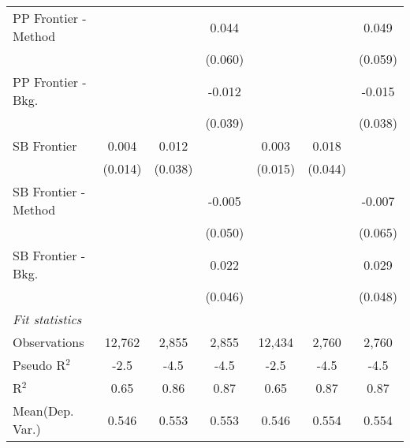 \begin{tabular}{lcccccc}
   PP Frontier - Method &                &         & 0.044   &                &         & 0.049\\   
                        &                &         & (0.060) &                &         & (0.059)\\   
   PP Frontier - Bkg.   &                &         & -0.012  &                &         & -0.015\\   
                        &                &         & (0.039) &                &         & (0.038)\\   
   SB Frontier          & 0.004          & 0.012   &         & 0.003          & 0.018   &   \\   
                        & (0.014)        & (0.038) &         & (0.015)        & (0.044) &   \\   
   SB Frontier - Method &                &         & -0.005  &                &         & -0.007\\   
                        &                &         & (0.050) &                &         & (0.065)\\   
   SB Frontier - Bkg.   &                &         & 0.022   &                &         & 0.029\\   
                        &                &         & (0.046) &                &         & (0.048)\\   
   \midrule
   \emph{Fit statistics}\\
   Observations         & 12,762         & 2,855   & 2,855   & 12,434         & 2,760   & 2,760\\  
   Pseudo R$^2$         & -2.5           & -4.5    & -4.5    & -2.5           & -4.5    & -4.5\\  
   R$^2$                & 0.65           & 0.86    & 0.87    & 0.65           & 0.87    & 0.87\\  
Mean(Dep. Var.) & 0.546 & 0.553 & 0.553 & 0.546 & 0.554 & 0.554 \\
   

\end{tabular}
